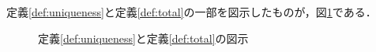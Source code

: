 \begin{comment}
\begin{definition}[一意性]
	\begin{align*}
		\text{$R$は単射（左一意的）である．} &\Leftrightarrow \forall a_1, a_2 \in A, \forall b \in B \left[a_1Rb \wedge a_2Rb \Rightarrow a_1 = a_2 \right] \\
		\text{$R$は関数的（右一意的）である．} &\Leftrightarrow \forall a \in A, \forall b_1, b_2 \in B \left[aRb_1 \wedge aRb_2 \Rightarrow b_1 = b_2 \right] \\
		\text{$R$は一対一である．} &\Leftrightarrow \text{$R$は左一意的かつ右一意的である．}
	\end{align*}
\end{definition}
\begin{definition}[全域性]
	\begin{align*}
	\text{$R$は全域射（左全域的）である．} &\Leftrightarrow \forall a \in A, \exists b \in B \text{ s.t. } aRb \\
	\text{$R$は全射（右全域的）である．} &\Leftrightarrow \forall b \in B, \exists a \in A \text{ s.t. } aRb \\
	\text{$R$は対応である．} &\Leftrightarrow \text{$R$は左全域的かつ右全域的である．}
	\end{align*}
\end{definition}
\end{comment}
定義\ref{def:uniqueness}と定義\ref{def:total}の一部を図示したものが，図\ref{fig:relationProperty}である．

\vfill
\begin{figure}[!h]
	\caption{定義\ref{def:uniqueness}と定義\ref{def:total}の図示}
	\label{fig:relationProperty}
\end{figure}
\afterpage{\clearpage}
\newpage

